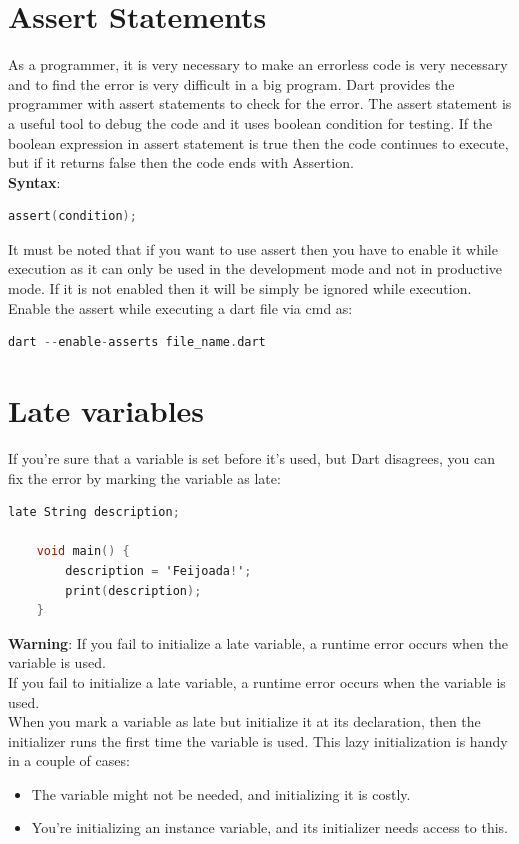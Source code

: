\section{Assert Statements}
As a programmer, it is very necessary to make an errorless code is very necessary and to find the error is very difficult in a big program. Dart provides the programmer with assert statements to check for the error. The assert statement is a useful tool to debug the code and it uses boolean condition for testing. If the boolean expression in assert statement is true then the code continues to execute, but if it returns false then the code ends with Assertion.\\
\textbf{Syntax}: 
\begin{lstlisting}[language=C]
	assert(condition);
\end{lstlisting}
It must be noted that if you want to use assert then you have to enable it while execution as it can only be used in the development mode and not in productive mode. If it is not enabled then it will be simply be ignored while execution.
\\Enable the assert while executing a dart file via cmd as:

\begin{lstlisting}[language=C]
	dart --enable-asserts file_name.dart
\end{lstlisting}

\section{Late variables}
If you're sure that a variable is set before it's used, but Dart disagrees, you can fix the error by marking the variable as late:
\begin{lstlisting}[language=C]
	late String description;
	
	void main() {
		description = 'Feijoada!';
		print(description);
	}
\end{lstlisting}
\textbf{Warning}:  If you fail to initialize a late variable, a runtime error occurs when the variable is used.
 \\If you fail to initialize a late variable, a runtime error occurs when the variable is used.
 \\When you mark a variable as late but initialize it at its declaration, then the initializer runs the first time the variable is used. This lazy initialization is handy in a couple of cases:
\begin{itemize}
	\item The variable might not be needed, and initializing it is costly.
	\item You're initializing an instance variable, and its initializer needs access to this.
\end{itemize}

